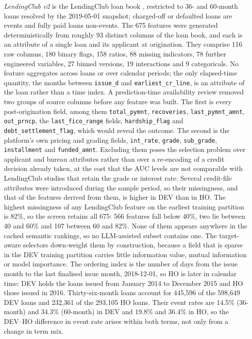 \documentclass[final,5p,twocolumn]{elsarticle}
\begin{document}
\emph{LendingClub v2} is the LendingClub loan book \cite{lendingclub_kaggle}, restricted to 36- and 60-month loans resolved by the 2019-05-01 snapshot; charged-off or defaulted loans are events and fully paid loans non-events. The 675 features were generated deterministically from roughly 93 distinct columns of the loan book, and each is an attribute of a single loan and its applicant at origination. They comprise 116 raw columns, 180 binary flags, 158 ratios, 88 missing indicators, 78 further engineered variables, 27 binned versions, 19 interactions and 9 categoricals. No feature aggregates across loans or over calendar periods; the only elapsed-time quantity, the months between \texttt{issue\_\allowbreak d} and \texttt{earliest\_\allowbreak cr\_\allowbreak line}, is an attribute of the loan rather than a time index. A prediction-time availability review removed two groups of source columns before any feature was built. The first is every post-origination field, among them \texttt{total\_\allowbreak pymnt}, \texttt{recoveries}, \texttt{last\_\allowbreak pymnt\_\allowbreak amnt}, \texttt{out\_\allowbreak prncp}, the \texttt{last\_\allowbreak fico\_\allowbreak range} fields, \texttt{hardship\_\allowbreak flag} and \texttt{debt\_\allowbreak settlement\_\allowbreak flag}, which would reveal the outcome. The second is the platform's own pricing and grading fields, \texttt{int\_\allowbreak rate}, \texttt{grade}, \texttt{sub\_\allowbreak grade}, \texttt{installment} and \texttt{funded\_\allowbreak amnt}. Excluding them poses the selection problem over applicant and bureau attributes rather than over a re-encoding of a credit decision already taken, at the cost that the AUC levels are not comparable with LendingClub studies that retain the grade or interest rate. Several credit-file attributes were introduced during the sample period, so their missingness, and that of the features derived from them, is higher in DEV than in HO. The highest missingness of any LendingClub feature on the earliest training partition is 82\%, so the screen retains all 675: 566 features fall below 40\%, two lie between 40 and 60\% and 107 between 60 and 82\%. None of them appears anywhere in the cached semantic rankings, so no LLM-assisted subset contains one. The target-aware selectors down-weight them by construction, because a field that is sparse in the DEV training partition carries little information value, mutual information or model importance. The ordering index is the number of days from the issue month to the last finalised issue month, 2018-12-01, so HO is later in calendar time: DEV holds the loans issued from January 2014 to December 2015 and HO those issued in 2016. Thirty-six-month loans account for 445,596 of the 598,649 DEV loans and 232,361 of the 293,105 HO loans. Their event rates are 14.5\% (36-month) and 34.3\% (60-month) in DEV and 19.8\% and 36.4\% in HO, so the DEV--HO difference in event rate arises within both terms, not only from a change in term mix.
\end{document}
